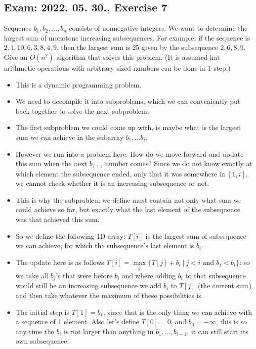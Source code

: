 \subsection{Exam: 2022. 05. 30., Exercise 7}


Sequence $b_1,b_2,\dots{},b_n$ consists of nonnegative integers. We want to
determine the largest sum of monotone increasing subsequences. For example, if
the sequence is $2,1,10,6,3,8,4,9$, then the largest sum is $25$ given by
the subsequence $2,6,8,9$. Give an $O(n^2)$ algorithm that solves this problem.
(It is assumed hat arithmetic operations with arbitrary sized numbers can be
done in $1$ step.)


\begin{itemize}
    \item This is a dynamic programming problem.
    \item We need to decompile it into subproblems, which we can conveniently put back together to solve the next subproblem.
    \item The first subproblem we could come up with, is maybe what is the largest sum we can achieve in the subarray $b_1, \dots{} b_i$.
    \item However we run into a problem here: How do we move forward and update this sum when the next $b_{i+1}$ number comes? Since we do not know exactly at which element the subsequence ended, only that it was somewhere in $[1,i]$, we cannot check whether it is an increasing subsequence or not.
    \item This is why the subproblem we define must contain not only what sum we could achieve so far, but exactly what the last element of the subsequence was that achieved this sum.
    \item So we define the following 1D array: $T[i]$ is the largest sum of subsequence we can achieve, for which the subsequence's last element is $b_i$.
    \item The update here is as follows $T[i] = \max\limits_{j}\{T[j]+b_i ~|~ j < i \text{ and } b_j < b_i \}$: so we take all $b_j$'s that were before $b_i$ and where adding $b_i$ to that subsequence would still be an increasing subsequence we add $b_i$ to $T[j]$ (the current sum) and then take whatever the maximum of these possibilities is.
    \item The initial step is $T[1] = b_1$, since that is the only thing we can achieve with a sequence of 1 element. Also let's define $T[0] = 0$, and $b_0 = -\infty{}$, this is so any time the $b_i$ is not larger than anything in $b_1,\dots{},b_{i-1}$, it can still start its own subsequence.

\end{itemize}
